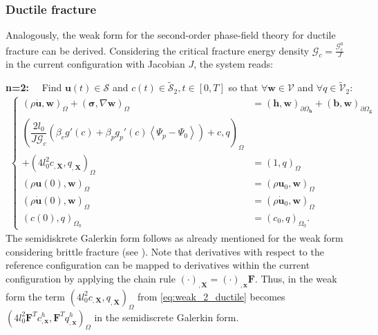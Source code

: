 \subsubsection{Ductile fracture} \label{sec:weak_ductile}
Analogously, the weak form for the second-order phase-field theory for ductile fracture can be derived. Considering the critical fracture energy density $\mathcal{G}_{c}=\frac{\mathcal{G}_{c}^{0}}{J}$ in the current configuration with Jacobian $J$, the system reads:

\textbf{n=2:}$\quad$ Find $\mathbf{u}\left(t\right)\in\bm{\mathcal{S}}$ and $c\left(t\right)\in\tilde{\mathcal{S}}_{2},t\in\left[0,T\right]$ so that $\forall \mathbf{w}\in\bm{\mathcal{V}}$ and $\forall q\in\tilde{\mathcal{V}}_{2}$:
\begin{equation} \label{eq:weak_2_ductile}
\begin{aligned}
\left\{\begin{alignedat}{1}
	\left(\rho \ddot{\mathbf{u}},\mathbf{w}\right)_{\Omega} + \left(\bm{\sigma},\nabla\mathbf{w}\right)_{\Omega} &= \left(\mathbf{h},\mathbf{w}\right)_{\partial\Omega_{\mathbf{h}}} + \left(\mathbf{b},\mathbf{w}\right)_{\partial\Omega_{\mathbf{g}}} \\
	\left(\dfrac{2l_{0}}{J\mathcal{G}_{c}}\left(\beta_{e}g'\left(c\right)+\beta_{p}g_{p}'\left(c\right)\left<\Psi_{p}-\Psi_{0}\right>\right)+c,q\right)_{\Omega} & \\
	+\left(4l_{0}^{2} c_{,\mathbf{X}}, q_{,\mathbf{X}}\right)_{\Omega} &= \left(1,q\right)_{\Omega} \\
	\left(\rho\mathbf{u}\left(0\right),\mathbf{w}\right)_{\Omega} &= \left(\rho\mathbf{u}_{0},\mathbf{w}\right)_{\Omega} \\
	\left(\rho\dot{\mathbf{u}}\left(0\right),\mathbf{w}\right)_{\Omega} &= \left(\rho\dot{\mathbf{u}}_{0},\mathbf{w}\right)_{\Omega} \\
	\left(c\left(0\right),q\right)_{\Omega_{0}} &= \left(c_{0},q\right)_{\Omega_{0}}.
\end{alignedat}\right.
\end{aligned}
\end{equation}
The semidiskrete Galerkin form follows as already mentioned for the weak form considering brittle fracture (see ). Note that derivatives with respect to the reference configuration can be mapped to derivatives within the current configuration by applying the chain rule $\left(\cdot\right)_{,\mathbf{X}}=\left(\cdot\right)_{,\mathbf{x}}\mathbf{F}$. Thus, in the weak form the term $\left(4l_{0}^{2} c_{,\mathbf{X}}, q_{,\mathbf{X}}\right)_{\Omega}$ from \eqref{eq:weak_2_ductile} becomes $\left(4l_{0}^{2} \mathbf{F}^{T}c_{,\mathbf{x}}^{h}, \mathbf{F}^{T}q_{,\mathbf{x}}^{h}\right)_{\Omega}$ in the semidiscrete Galerkin form.

